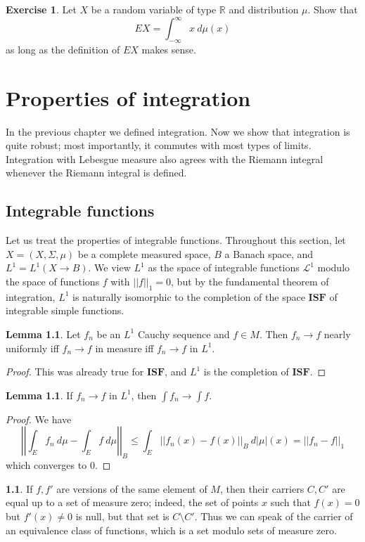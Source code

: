 \documentclass[12pt]{book}
\newcommand{\RR}{\mathbb{R}}
\newcommand{\ISF}{\mathbf{ISF}}
\theoremstyle{definition}
\newtheorem{lemma}[theorem]{Lemma}
\newtheorem{subsec}[theorem]{}
\newtheorem{exercise}[theorem]{Exercise}
\begin{document}
\begin{exercise}
\label{integrating a distribution}
Let $X$ be a random variable of type $\RR$ and distribution $\mu$. Show that
$$EX = \int_{-\infty}^\infty x ~d\mu(x)$$
as long as the definition of $EX$ makes sense.
\end{exercise}

\chapter{Properties of integration}
In the previous chapter we defined integration. Now we show that integration is quite robust; most importantly, it commutes with most types of limits.
Integration with Lebesgue measure also agrees with the Riemann integral whenever the Riemann integral is defined.

\section{Integrable functions}
Let us treat the properties of integrable functions.
Throughout this section, let $X = (X, \Sigma, \mu)$ be a complete measured space, $B$ a Banach space, and $L^1 = L^1(X \to B)$.
We view $L^1$ as the space of integrable functions $\mathcal L^1$ modulo the space of functions $f$ with $||f||_1 = 0$, but by the fundamental theorem of integration, $L^1$ is naturally isomorphic to the completion of the space $\ISF$ of integrable simple functions.

\begin{lemma}
Let $f_n$ be an $L^1$ Cauchy sequence and $f \in M$. Then $f_n \to f$ nearly uniformly iff $f_n \to f$ in measure iff $f_n \to f$ in $L^1$.
\end{lemma}
\begin{proof}
This was already true for $\ISF$, and $L^1$ is the completion of $\ISF$.
\end{proof}

\begin{lemma}
If $f_n \to f$ in $L^1$, then $\int f_n \to \int f$.
\end{lemma}
\begin{proof}
We have
$$\left|\left| \int_E f_n ~d\mu - \int_E f ~d\mu \right| \right|_B \leq \int_E ||f_n(x) - f(x)||_B ~d|\mu|(x) = ||f_n - f||_1$$
which converges to $0$.
\end{proof}

\begin{subsec}
If $f, f'$ are versions of the same element of $M$, then their carriers $C,C'$ are equal up to a set of measure zero; indeed, the set of points $x$ such that $f(x) = 0$ but $f'(x) \neq 0$ is null, but that set is $C \setminus C'$.
Thus we can speak of the carrier of an equivalence class of functions, which is a set modulo sets of measure zero.
\end{subsec}
\end{document}
